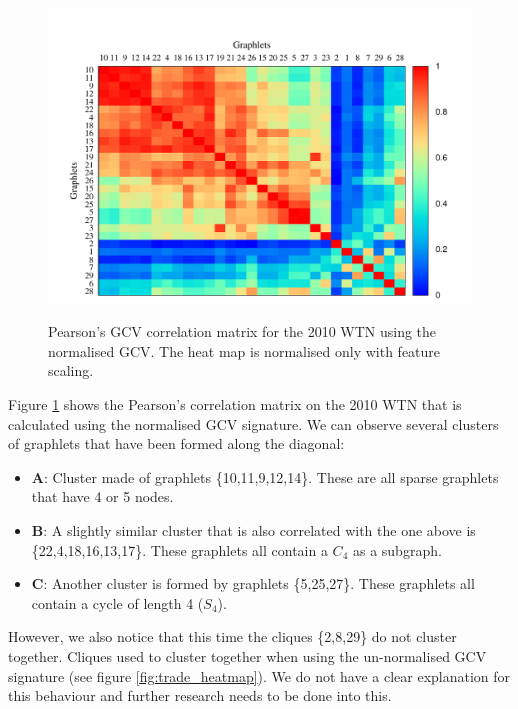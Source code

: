 \begin{figure}[H]
  \centering
  \hbox{\hspace{-1cm}
  \includegraphics[scale=1.0]{../code/final_results_norm1/trade_2010_thresholded/heatmap_pearsons_hclust_trade_2010_thresholded2.pdf}}
  \caption[Pearson's GCV correlation matrix for the 2010 WTN using the normalised GCV]{Pearson's GCV correlation matrix for the 2010 WTN using the normalised GCV. The heat map is normalised only with feature scaling.}
  \label{fig:trade_norm1}
\end{figure}


Figure \ref{fig:trade_norm1} shows the Pearson's correlation matrix on the 2010 WTN that is calculated using the normalised GCV signature. We can observe several clusters of graphlets that have been formed along the diagonal:
\begin{itemize}
 \item \textbf{A}: Cluster made of graphlets \{10,11,9,12,14\}. These are all sparse graphlets that have 4 or 5 nodes.
 \item \textbf{B}: A slightly similar cluster that is also correlated with the one above is \{22,4,18,16,13,17\}. These graphlets all contain a $C_4$ as a subgraph.
 \item \textbf{C}: Another cluster is formed by graphlets \{5,25,27\}. These graphlets all contain a cycle of length 4 ($S_4$).  
\end{itemize}

However, we also notice that this time the cliques \{2,8,29\} do not cluster together. Cliques used to cluster together when using the un-normalised GCV signature (see figure \ref{fig:trade_heatmap}). We do not have a clear explanation for this behaviour and further research needs to be done into this. 

